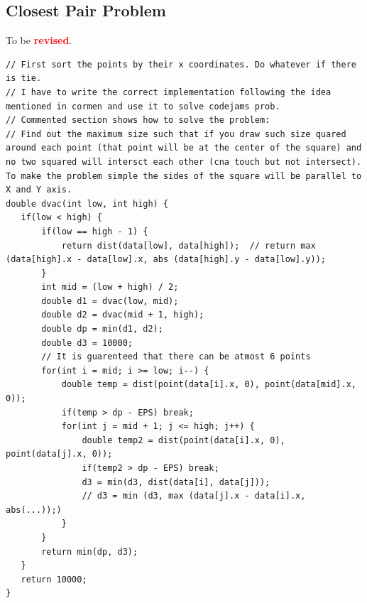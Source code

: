 \documentclass[8pt, a4paper, oneside, twocolumn]{extarticle}
\newcommand{\revised}{To be \textcolor{red}{\textbf{revised}}.}
\begin{document}
\subsection{Closest Pair Problem}
\revised
\begin{verbatim}
// First sort the points by their x coordinates. Do whatever if there is tie.
// I have to write the correct implementation following the idea mentioned in cormen and use it to solve codejams prob.
// Commented section shows how to solve the problem: 
// Find out the maximum size such that if you draw such size quared around each point (that point will be at the center of the square) and no two squared will intersct each other (cna touch but not intersect). To make the problem simple the sides of the square will be parallel to X and Y axis.
double dvac(int low, int high) {
   if(low < high) {
       if(low == high - 1) {
           return dist(data[low], data[high]);  // return max (data[high].x - data[low].x, abs (data[high].y - data[low].y));  
       }
       int mid = (low + high) / 2;
       double d1 = dvac(low, mid);
       double d2 = dvac(mid + 1, high);
       double dp = min(d1, d2);
       double d3 = 10000;
       // It is guarenteed that there can be atmost 6 points
       for(int i = mid; i >= low; i--) {
           double temp = dist(point(data[i].x, 0), point(data[mid].x, 0));
           if(temp > dp - EPS) break;
           for(int j = mid + 1; j <= high; j++) {
               double temp2 = dist(point(data[i].x, 0), point(data[j].x, 0));
               if(temp2 > dp - EPS) break;
               d3 = min(d3, dist(data[i], data[j]));
               // d3 = min (d3, max (data[j].x - data[i].x, abs(...));)
           }
       }
       return min(dp, d3);
   }
   return 10000;
}

\end{verbatim}
\end{document}
